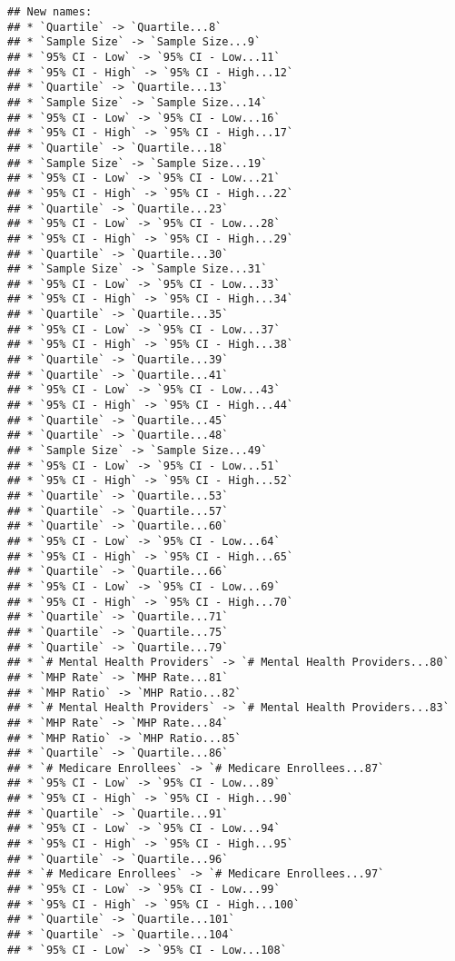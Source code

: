 \documentclass[
]{article}
\begin{document}
\begin{verbatim}
## New names:
## * `Quartile` -> `Quartile...8`
## * `Sample Size` -> `Sample Size...9`
## * `95% CI - Low` -> `95% CI - Low...11`
## * `95% CI - High` -> `95% CI - High...12`
## * `Quartile` -> `Quartile...13`
## * `Sample Size` -> `Sample Size...14`
## * `95% CI - Low` -> `95% CI - Low...16`
## * `95% CI - High` -> `95% CI - High...17`
## * `Quartile` -> `Quartile...18`
## * `Sample Size` -> `Sample Size...19`
## * `95% CI - Low` -> `95% CI - Low...21`
## * `95% CI - High` -> `95% CI - High...22`
## * `Quartile` -> `Quartile...23`
## * `95% CI - Low` -> `95% CI - Low...28`
## * `95% CI - High` -> `95% CI - High...29`
## * `Quartile` -> `Quartile...30`
## * `Sample Size` -> `Sample Size...31`
## * `95% CI - Low` -> `95% CI - Low...33`
## * `95% CI - High` -> `95% CI - High...34`
## * `Quartile` -> `Quartile...35`
## * `95% CI - Low` -> `95% CI - Low...37`
## * `95% CI - High` -> `95% CI - High...38`
## * `Quartile` -> `Quartile...39`
## * `Quartile` -> `Quartile...41`
## * `95% CI - Low` -> `95% CI - Low...43`
## * `95% CI - High` -> `95% CI - High...44`
## * `Quartile` -> `Quartile...45`
## * `Quartile` -> `Quartile...48`
## * `Sample Size` -> `Sample Size...49`
## * `95% CI - Low` -> `95% CI - Low...51`
## * `95% CI - High` -> `95% CI - High...52`
## * `Quartile` -> `Quartile...53`
## * `Quartile` -> `Quartile...57`
## * `Quartile` -> `Quartile...60`
## * `95% CI - Low` -> `95% CI - Low...64`
## * `95% CI - High` -> `95% CI - High...65`
## * `Quartile` -> `Quartile...66`
## * `95% CI - Low` -> `95% CI - Low...69`
## * `95% CI - High` -> `95% CI - High...70`
## * `Quartile` -> `Quartile...71`
## * `Quartile` -> `Quartile...75`
## * `Quartile` -> `Quartile...79`
## * `# Mental Health Providers` -> `# Mental Health Providers...80`
## * `MHP Rate` -> `MHP Rate...81`
## * `MHP Ratio` -> `MHP Ratio...82`
## * `# Mental Health Providers` -> `# Mental Health Providers...83`
## * `MHP Rate` -> `MHP Rate...84`
## * `MHP Ratio` -> `MHP Ratio...85`
## * `Quartile` -> `Quartile...86`
## * `# Medicare Enrollees` -> `# Medicare Enrollees...87`
## * `95% CI - Low` -> `95% CI - Low...89`
## * `95% CI - High` -> `95% CI - High...90`
## * `Quartile` -> `Quartile...91`
## * `95% CI - Low` -> `95% CI - Low...94`
## * `95% CI - High` -> `95% CI - High...95`
## * `Quartile` -> `Quartile...96`
## * `# Medicare Enrollees` -> `# Medicare Enrollees...97`
## * `95% CI - Low` -> `95% CI - Low...99`
## * `95% CI - High` -> `95% CI - High...100`
## * `Quartile` -> `Quartile...101`
## * `Quartile` -> `Quartile...104`
## * `95% CI - Low` -> `95% CI - Low...108`

\end{verbatim}
\end{document}
